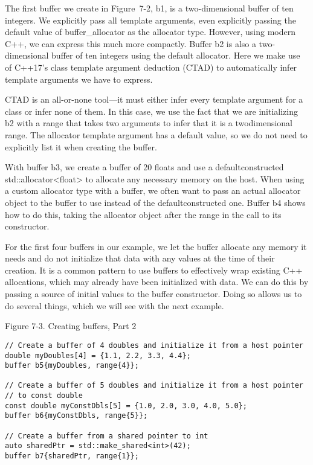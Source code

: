 The first buffer we create in Figure 7-2, b1, is a two-dimensional buffer of ten integers. We explicitly pass all template arguments, even explicitly passing the default value of buffer\_allocator as the allocator type. However, using modern C++, we can express this much more compactly. Buffer b2 is also a two-dimensional buffer of ten integers using the default allocator. Here we make use of C++17’s class template argument deduction (CTAD) to automatically infer template arguments we have to express.\par

CTAD is an all-or-none tool—it must either infer every template argument for a class or infer none of them. In this case, we use the fact that we are initializing b2 with a range that takes two arguments to infer that it is a twodimensional range. The allocator template argument has a default value, so we do not need to explicitly list it when creating the buffer.\par

With buffer b3, we create a buffer of 20 floats and use a defaultconstructed std::allocator<float> to allocate any necessary memory on the host. When using a custom allocator type with a buffer, we often want to pass an actual allocator object to the buffer to use instead of the defaultconstructed one. Buffer b4 shows how to do this, taking the allocator object after the range in the call to its constructor.\par

For the first four buffers in our example, we let the buffer allocate any memory it needs and do not initialize that data with any values at the time of their creation. It is a common pattern to use buffers to effectively wrap existing C++ allocations, which may already have been initialized with data. We can do this by passing a source of initial values to the buffer constructor. Doing so allows us to do several things, which we will see with the next example.\par

\hspace*{\fill} \par %
Figure 7-3. Creating buffers, Part 2
\begin{lstlisting}[caption={}]
// Create a buffer of 4 doubles and initialize it from a host pointer
double myDoubles[4] = {1.1, 2.2, 3.3, 4.4};
buffer b5{myDoubles, range{4}};

// Create a buffer of 5 doubles and initialize it from a host pointer 
// to const double
const double myConstDbls[5] = {1.0, 2.0, 3.0, 4.0, 5.0};
buffer b6{myConstDbls, range{5}};

// Create a buffer from a shared pointer to int
auto sharedPtr = std::make_shared<int>(42);
buffer b7{sharedPtr, range{1}};
\end{lstlisting}

